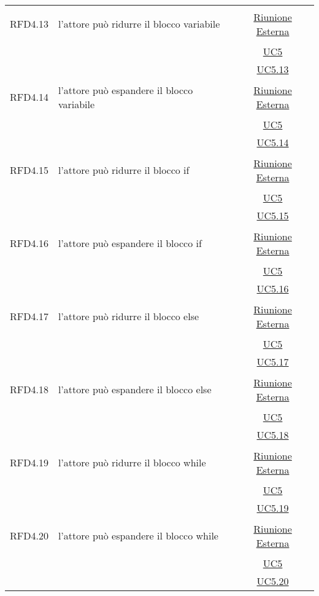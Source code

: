 \begin{longtable}{|c|>{\centering}m{7cm}|c|}
\hypertarget{RFD4.13}{RFD4.13} & l'attore può ridurre il blocco variabile & \hyperlink{Riunione Esterna}{Riunione Esterna}\\
& &\hyperref[UC5]{UC5}\\
& &\hyperref[UC5.13]{UC5.13}\\ \hline

\hypertarget{RFD4.14}{RFD4.14} & l'attore può espandere il blocco variabile & \hyperlink{Riunione Esterna}{Riunione Esterna}\\
& &\hyperref[UC5]{UC5}\\
& &\hyperref[UC5.14]{UC5.14}\\ \hline

\hypertarget{RFD4.15}{RFD4.15} & l'attore può ridurre il blocco if & \hyperlink{Riunione Esterna}{Riunione Esterna}\\
& &\hyperref[UC5]{UC5}\\
& &\hyperref[UC5.15]{UC5.15}\\ \hline

\hypertarget{RFD4.16}{RFD4.16} & l'attore può espandere il blocco if & \hyperlink{Riunione Esterna}{Riunione Esterna}\\
& &\hyperref[UC5]{UC5}\\
& &\hyperref[UC5.16]{UC5.16}\\ \hline

\hypertarget{RFD4.17}{RFD4.17} & l'attore può ridurre il blocco else & \hyperlink{Riunione Esterna}{Riunione Esterna}\\
& &\hyperref[UC5]{UC5}\\
& & \hyperref[UC5.17]{UC5.17}\\ \hline

\hypertarget{RFD4.18}{RFD4.18} & l'attore può espandere il blocco else &  \hyperlink{Riunione Esterna}{Riunione Esterna}\\
& &\hyperref[UC5]{UC5}\\
& &\hyperref[UC5.18]{UC5.18}\\ \hline

\hypertarget{RFD4.19}{RFD4.19} & l'attore può ridurre il blocco while & \hyperlink{Riunione Esterna}{Riunione Esterna}\\
& &\hyperref[UC5]{UC5}\\
& & \hyperref[UC5.19]{UC5.19}\\ \hline

\hypertarget{RFD4.20}{RFD4.20} & l'attore può espandere il blocco while &  \hyperlink{Riunione Esterna}{Riunione Esterna}\\
& &\hyperref[UC5]{UC5}\\
& &\hyperref[UC5.20]{UC5.20}\\ \hline


\end{longtable}
